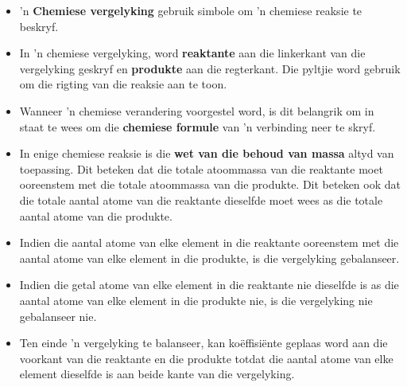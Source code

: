 
            \nopagebreak
      \label{m38727*id67171}\begin{itemize}[noitemsep]
            \label{m38727*uid36}\item 'n \textbf{Chemiese vergelyking} gebruik simbole om 'n chemiese reaksie te beskryf.
\label{m38727*uid37}\item In 'n chemiese vergelyking, word \textbf{reaktante} aan die linkerkant van die vergelyking geskryf en \textbf{produkte} aan die regterkant. Die pyltjie word gebruik om die rigting van die reaksie aan te toon.
\label{m38727*uid38}\item Wanneer  'n chemiese verandering voorgestel word, is dit belangrik om in staat te wees om die \textbf{chemiese formule} van  'n verbinding neer te skryf.
\label{m38727*uid39}\item In enige chemiese reaksie is die \textbf{wet van die behoud van massa} altyd van toepassing. Dit beteken dat die totale atoommassa van die reaktante moet ooreenstem met die totale atoommassa van die produkte. Dit beteken ook dat die totale aantal atome van die reaktante dieselfde moet wees as die totale aantal atome van die produkte.
\label{m38727*uid41}\item Indien die aantal atome van elke element in die reaktante ooreenstem met die aantal atome van elke element in die produkte, is die vergelyking gebalanseer.
\label{m38727*uid42}\item Indien die getal atome van elke element in die reaktante nie dieselfde is as die aantal atome van elke element in die produkte nie, is die vergelyking nie gebalanseer nie.
\item Ten einde 'n vergelyking te balanseer,  kan koëffisiënte geplaas word aan die voorkant van die reaktante en die  produkte totdat die aantal atome van elke element dieselfde is aan beide kante van die vergelyking.
\end{itemize}


